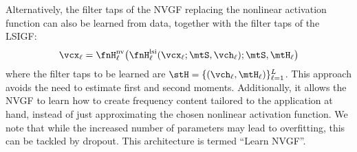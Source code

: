 Alternatively, the filter taps of the NVGF replacing the nonlinear activation function can also be learned from data, together with the filter taps of the LSIGF:
\begin{equation} \label{eq:learnNVGF}
    \vcx_{\ell} = \fnH_{\ell}^{\text{nv}} \big( \fnH_{\ell}^{\text{lsi}} (\vcx_{\ell}; \mtS, \vch_{\ell}); \mtS, \mtH_{\ell} \big)
\end{equation}
%
where the filter taps to be learned are $\stH = \{(\vch_{\ell},\mtH_{\ell})\}_{\ell=1}^L$. This approach avoids the need to estimate first and second moments. Additionally, it allows the NVGF to learn how to create frequency content tailored to the application at hand, instead of just approximating the chosen nonlinear activation function. We note that while the increased number of parameters may lead to overfitting, this can be tackled by dropout. This architecture is termed ``Learn NVGF''.


